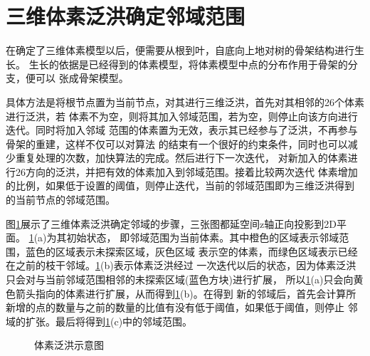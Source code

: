\section{三维体素泛洪确定邻域范围}
在确定了三维体素模型以后，便需要从根到叶，自底向上地对树的骨架结构进行生长。
生长的依据是已经得到的体素模型，将体素模型中点的分布作用于骨架的分支，便可以
张成骨架模型。

具体方法是将根节点置为当前节点，对其进行三维泛洪，首先对其相邻的26个体素进行泛洪，若
体素不为空，则将其加入邻域范围，若为空，则停止向该方向进行迭代。同时将加入邻域
范围的体素置为无效，表示其已经参与了泛洪，不再参与骨架的重建，这样不仅可以对算法
的结束有一个很好的约束条件，同时也可以减少重复处理的次数，加快算法的完成。然后进行下一次迭代，
对新加入的体素进行26方向的泛洪，并把有效的体素加入到邻域范围。接着比较两次迭代
体素增加的比例，如果低于设置的阈值，则停止迭代，当前的邻域范围即为三维泛洪得到
的当前节点的邻域范围。

图\ref{fig:3dfld}展示了三维体素泛洪确定邻域的步骤，三张图都延空间z轴正向投影到2D平面。
\ref{fig:3dfld}(a)为其初始状态，
即邻域范围为当前体素。其中橙色的区域表示邻域范围，蓝色的区域表示未探索区域，灰色区域
表示空的体素，而绿色区域表示已经在之前的枝干邻域。\ref{fig:3dfld}(b)表示体素泛洪经过
一次迭代以后的状态，因为体素泛洪只会对与当前邻域范围相邻的未探索区域(蓝色方块)进行扩展，
所以\ref{fig:3dfld}(a)只会向黄色箭头指向的体素进行扩展，从而得到\ref{fig:3dfld}(b)。在得到
新的邻域后，首先会计算所新增的点的数量与之前的数量的比值有没有低于阈值，如果低于阈值，则停止
邻域的扩张。最后将得到\ref{fig:3dfld}(c)中的邻域范围。

\begin{figure}[H]
	\centering
	\hspace{4em}
	\hspace{4em}
	\caption{体素泛洪示意图}
	\label{fig:3dfld}
\end{figure}

